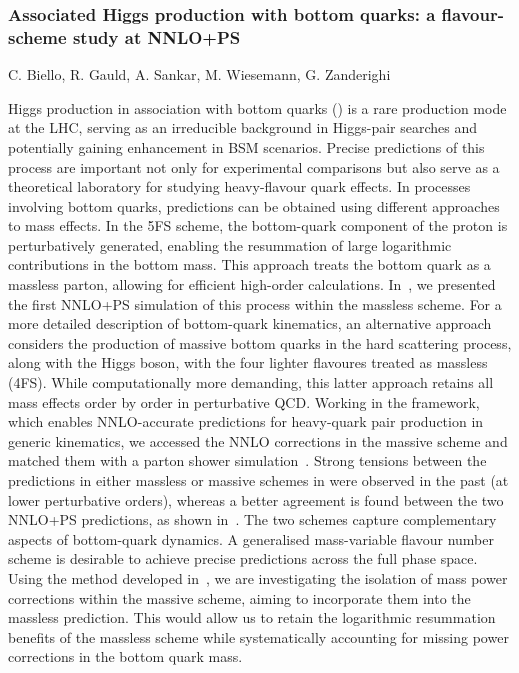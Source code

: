 \documentclass{FBR_Bericht_2025}
\begin{document}
\begin{refsection}
\subsubsection{Associated Higgs production with bottom quarks: a flavour-scheme study at NNLO+PS}
\begin{Namen}
C. Biello, R. Gauld, A. Sankar, M. Wiesemann, G. Zanderighi
\end{Namen}
Higgs production in association with bottom quarks (\bbH{}) is a rare production mode at the LHC, serving as an irreducible background in Higgs-pair searches and potentially gaining enhancement in BSM scenarios. 
Precise predictions of this process are important not only for experimental comparisons but also serve as a theoretical laboratory for studying heavy-flavour quark effects. 
In processes involving bottom quarks, predictions can be obtained using different approaches to mass effects. In the 5FS scheme, the bottom-quark component of the proton is perturbatively generated, enabling the resummation of large logarithmic contributions in the bottom mass. 
This approach treats the bottom quark as a massless parton, allowing for efficient high-order calculations. In~, we presented the first NNLO+PS simulation of this process within the massless scheme. For a more detailed description of bottom-quark kinematics, an alternative approach considers the production of massive bottom quarks in the hard scattering process, along with the Higgs boson, with the four lighter flavoures treated as massless (4FS). 
While computationally more demanding, this latter approach retains all mass effects order by order in perturbative QCD. Working in the \minnlo{} framework, which enables NNLO-accurate predictions for heavy-quark pair production in generic kinematics, we accessed the NNLO corrections in the massive scheme and matched them with a parton shower simulation~. 
Strong tensions between the predictions in either massless or massive schemes in \bbH{} were observed in the past (at lower perturbative orders), 
whereas a better agreement is found between the two NNLO+PS predictions, as shown in~. 
The two schemes capture complementary aspects of bottom-quark dynamics. A generalised mass-variable flavour number scheme is desirable to achieve precise predictions across the full phase space. Using the method developed in~, we are investigating the isolation of mass power corrections within the massive scheme, aiming to incorporate them into the massless prediction. This would allow us to retain the logarithmic resummation benefits of the massless scheme while systematically accounting for missing power corrections in the bottom quark mass.


\end{refsection}
\end{document}
